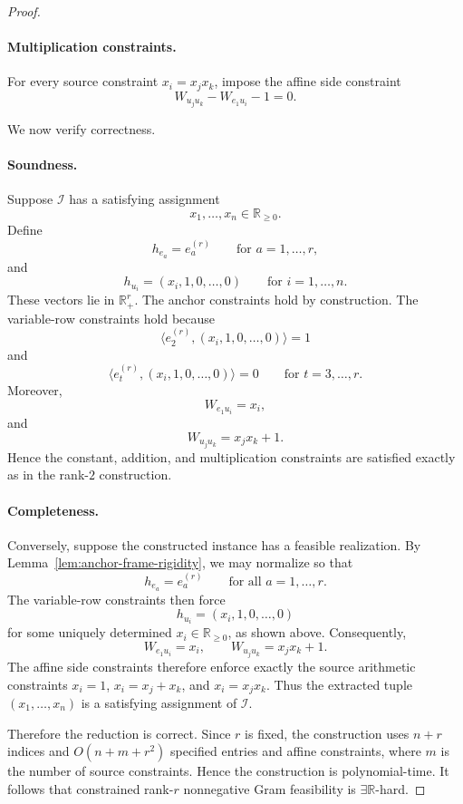 \documentclass[10pt,a4paper]{amsart}
\begin{document}
\begin{proof}
\paragraph{Multiplication constraints.}
For every source constraint \(x_i=x_jx_k\), impose the affine side constraint
\[
W_{u_j u_k}-W_{e_1 u_i}-1=0.
\]

We now verify correctness.

\paragraph{Soundness.}
Suppose \(\mathcal{I}\) has a satisfying assignment
\[
x_1,\dots,x_n\in\mathbb{R}_{\ge 0}.
\]
Define
\[
h_{e_a}=e_a^{(r)}
\qquad \text{for } a=1,\dots,r,
\]
and
\[
h_{u_i}=(x_i,1,0,\dots,0)
\qquad \text{for } i=1,\dots,n.
\]
These vectors lie in \(\mathbb{R}_+^r\). The anchor constraints hold by
construction. The variable-row constraints hold because
\[
\langle e_2^{(r)},(x_i,1,0,\dots,0)\rangle = 1
\]
and
\[
\langle e_t^{(r)},(x_i,1,0,\dots,0)\rangle = 0
\qquad \text{for } t=3,\dots,r.
\]
Moreover,
\[
W_{e_1 u_i}=x_i,
\]
and
\[
W_{u_j u_k}=x_jx_k+1.
\]
Hence the constant, addition, and multiplication constraints are satisfied
exactly as in the rank-$2$ construction.

\paragraph{Completeness.}
Conversely, suppose the constructed instance has a feasible realization.
By Lemma~\ref{lem:anchor-frame-rigidity}, we may normalize so that
\[
h_{e_a}=e_a^{(r)}
\qquad \text{for all } a=1,\dots,r.
\]
The variable-row constraints then force
\[
h_{u_i}=(x_i,1,0,\dots,0)
\]
for some uniquely determined \(x_i\in\mathbb{R}_{\ge 0}\), as shown above.
Consequently,
\[
W_{e_1 u_i}=x_i,
\qquad
W_{u_j u_k}=x_jx_k+1.
\]
The affine side constraints therefore enforce exactly the source arithmetic
constraints \(x_i=1\), \(x_i=x_j+x_k\), and \(x_i=x_jx_k\). Thus the extracted
tuple \((x_1,\dots,x_n)\) is a satisfying assignment of \(\mathcal{I}\).

Therefore the reduction is correct. Since \(r\) is fixed, the construction
uses \(n+r\) indices and \(O(n+m+r^2)\) specified entries and affine
constraints, where \(m\) is the number of source constraints. Hence the
construction is polynomial-time. It follows that constrained rank-$r$
nonnegative Gram feasibility is \(\exists\mathbb{R}\)-hard.
\end{proof}
\end{document}
